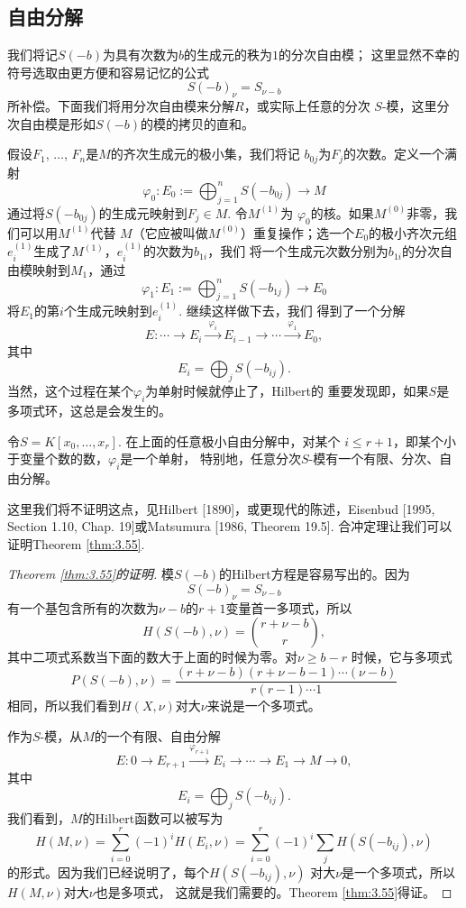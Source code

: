 \subsection{自由分解}\label{s:3.3.3}

我们将记$S(-b)$为具有次数为$b$的生成元的秩为$1$的分次自由模；
这里显然不幸的符号选取由更方便和容易记忆的公式
\[
	S(-b)_\nu =S_{\nu-b}
\]
所补偿。下面我们将用分次自由模来分解$R$，或实际上任意的分次
$S$-模，这里分次自由模是形如$S(-b)$的模的拷贝的直和。

假设$F_1$, $\dots$, $F_n$是$M$的齐次生成元的极小集，我们将记
$b_{0j}$为$F_j$的次数。定义一个满射
\[
	\varphi_0:E_0:=\bigoplus_{j=1}^n S(-b_{0j})\to M
\]
通过将$S(-b_{0j})$的生成元映射到$F_j\in M$. 令$M^{(1)}$为
$\varphi_0$的核。如果$M^{(0)}$非零，我们可以用$M^{(1)}$代替
$M$（它应被叫做$M^{(0)}$）重复操作；选一个$E_0$的极小齐次元组
$e^{(1)}_i$生成了$M^{(1)}$，$e^{(1)}_i$的次数为$b_{1i}$，我们
将一个生成元次数分别为$b_{1i}$的分次自由模映射到$M_1$，通过
\[
	\varphi_1:E_1:=\bigoplus_{j=1}^n S(-b_{1j})\to E_0
\]
将$E_1$的第$i$个生成元映射到$e_i^{(1)}$. 继续这样做下去，我们
得到了一个分解
\[
	E:\cdots \longrightarrow E_i 
	\xrightarrow{\,\,\varphi_i\,\,} E_{i-1}
	\longrightarrow \cdots  \xrightarrow{\,\,\varphi_1\,\,}
	E_0,
\]
其中
\[
	E_{i}=\bigoplus_j S(-b_{ij}).
\]
当然，这个过程在某个$\varphi_i$为单射时候就停止了，Hilbert的
重要发现即，如果$S$是多项式环，这总是会发生的。


\begin{thm}[Hilbert合冲定理]
令$S=K[x_0,\dots,x_r]$. 在上面的任意极小自由分解中，对某个
$i\leq r+1$，即某个小于变量个数的数，$\varphi_i$是一个单射，
特别地，任意分次$S$-模有一个有限、分次、自由分解。
\end{thm}

这里我们将不证明这点，见Hilbert [1890]，或更现代的陈述，Eisenbud
[1995, Section 1.10, Chap. 19]或Matsumura [1986, Theorem 19.5].
合冲定理让我们可以证明Theorem \ref{thm:3.55}.

\begin{proof}[{Theorem \ref{thm:3.55}的证明}]
模$S(-b)$的Hilbert方程是容易写出的。因为
\[
	S(-b)_\nu=S_{\nu-b}
\]
有一个基包含所有的次数为$\nu-b$的$r+1$变量首一多项式，所以
\[
	H(S(-b),\nu)=\binom{r+\nu-b}r,
\]
其中二项式系数当下面的数大于上面的时候为零。对$\nu\geq b-r$
时候，它与多项式
\[
	P(S(-b),\nu)=\frac{(r+\nu-b)(r+\nu-b-1)\cdots (\nu-b)}
	{r(r-1)\cdots 1}
\]
相同，所以我们看到$H(X,\nu)$对大$\nu$来说是一个多项式。

作为$S$-模，从$M$的一个有限、自由分解
\[
	E:0 \longrightarrow E_{r+1} 
	\xrightarrow{\varphi_{r+1}}E_{i}
	\longrightarrow \cdots  \longrightarrow E_1 
	\longrightarrow M \longrightarrow 0,
\]
其中
\[
	E_i=\bigoplus_j S(-b_{ij}).
\]
我们看到，$M$的Hilbert函数可以被写为
\[
	H(M,\nu)=\sum_{i=0}^r (-1)^i H(E_i,\nu)
	=\sum_{i=0}^r(-1)^i\sum_j H(S(-b_{ij}),\nu)
\]
的形式。因为我们已经说明了，每个$H(S(-b_{ij}),\nu)$
对大$\nu$是一个多项式，所以$H(M,\nu)$对大$\nu$也是多项式，
这就是我们需要的。Theorem \ref{thm:3.55}得证。
\end{proof}

